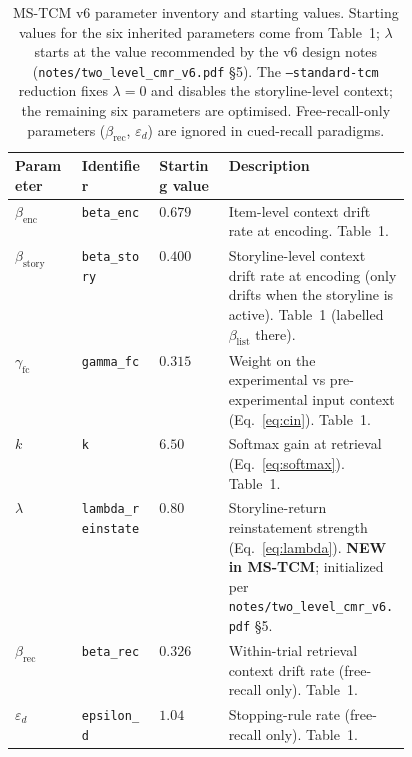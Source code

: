 \begin{table}[t]
\centering
\caption{MS-TCM v6 parameter inventory and starting values.
Starting values for the six inherited parameters come from
\citet{CornellZhang2025} Table~1; $\lambda$ starts at the value
recommended by the v6 design notes
(\texttt{notes/two\_level\_cmr\_v6.pdf} \S5). The
\texttt{--standard-tcm} reduction fixes $\lambda = 0$ and disables
the storyline-level context; the remaining six parameters are
optimised. Free-recall-only parameters ($\beta_{\mathrm{rec}}$,
$\varepsilon_{d}$) are ignored in cued-recall paradigms.}
\label{tab:params}
\small
\begin{tabular}{@{}l l l p{0.46\linewidth}@{}}
\hline
Parameter & Identifier & Starting value & Description \\
\hline
$\beta_{\mathrm{enc}}$ & \texttt{beta\_enc} & $0.679$ &
Item-level context drift rate at encoding.
\citep{CornellZhang2025} Table~1. \\
$\beta_{\mathrm{story}}$ & \texttt{beta\_story} & $0.400$ &
Storyline-level context drift rate at encoding (only drifts when the
storyline is active). \citep{CornellZhang2025} Table~1 (labelled
$\beta_{\mathrm{list}}$ there). \\
$\gamma_{\mathrm{fc}}$ & \texttt{gamma\_fc} & $0.315$ &
Weight on the experimental vs pre-experimental input context
(Eq.~\ref{eq:cin}). \citep{CornellZhang2025} Table~1. \\
$k$ & \texttt{k} & $6.50$ &
Softmax gain at retrieval (Eq.~\ref{eq:softmax}).
\citep{CornellZhang2025} Table~1. \\
$\lambda$ & \texttt{lambda\_reinstate} & $0.80$ &
Storyline-return reinstatement strength (Eq.~\ref{eq:lambda}).
\textbf{NEW in MS-TCM}; initialized per
\texttt{notes/two\_level\_cmr\_v6.pdf} \S5. \\
$\beta_{\mathrm{rec}}$ & \texttt{beta\_rec} & $0.326$ &
Within-trial retrieval context drift rate (free-recall only).
\citep{CornellZhang2025} Table~1. \\
$\varepsilon_{d}$ & \texttt{epsilon\_d} & $1.04$ &
Stopping-rule rate (free-recall only).
\citep{CornellZhang2025} Table~1. \\
\hline
\end{tabular}
\end{table}
